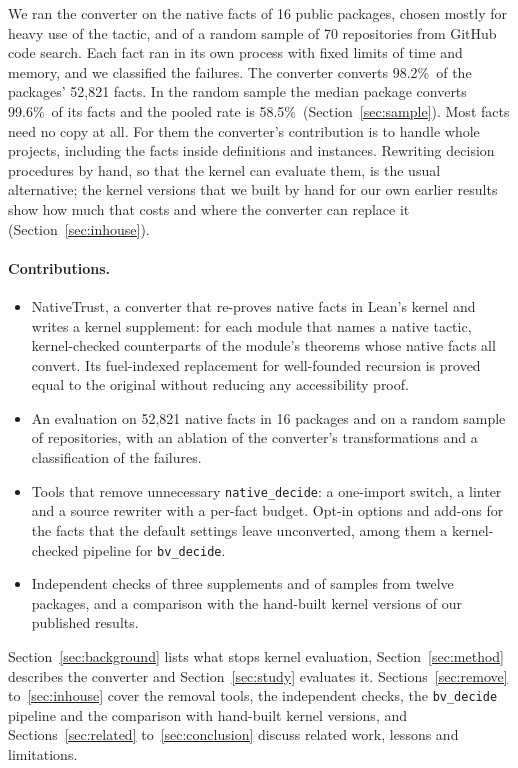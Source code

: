 \documentclass[11pt]{article}
\newcommand{\vtotrate}{98.2\%}   %
\newcommand{\vsamprate}{58.5\%}   %
\newcommand{\vsampmedian}{99.6\%}   %
\begin{document}
We ran the converter on the native facts of 16 public packages, chosen mostly for heavy use of the tactic, and
of a random sample of 70 repositories from GitHub code search. Each fact ran in its own process with fixed
limits of time and memory, and we classified the failures. The converter converts \vtotrate\ of the packages' 52,821
facts. In the random sample the median package converts \vsampmedian\ of its facts and the pooled rate is
\vsamprate\ (Section~\ref{sec:sample}). Most facts need no copy at all. For them the converter's
contribution is to handle whole projects, including the facts inside definitions and instances. Rewriting decision procedures by hand, so that the kernel can evaluate them, is the usual
alternative; the kernel versions that we built by hand for our own earlier results show how much that costs
and where the converter can replace it (Section~\ref{sec:inhouse}).

\paragraph{Contributions.}
\begin{itemize}
\item NativeTrust, a converter that re-proves native facts in Lean's kernel and writes a kernel supplement: for each module that names a native tactic, kernel-checked counterparts
  of the module's theorems whose native facts all convert. Its fuel-indexed replacement for well-founded
  recursion is proved equal to the original without reducing any accessibility proof.
\item An evaluation on 52,821 native facts in 16 packages and on a random sample of repositories, with an
  ablation of the converter's transformations and a classification of the failures.
\item Tools that remove unnecessary \texttt{native\_decide}: a one-import switch, a linter and a source
  rewriter with a per-fact budget. Opt-in options and add-ons for the facts that the default settings leave
  unconverted, among them a kernel-checked pipeline for \texttt{bv\_decide}.
\item Independent checks of three supplements and of samples from twelve packages, and a comparison with the
  hand-built kernel versions of our published results.
\end{itemize}
Section~\ref{sec:background} lists what stops kernel evaluation, Section~\ref{sec:method} describes the
converter and Section~\ref{sec:study} evaluates it. Sections~\ref{sec:remove} to~\ref{sec:inhouse} cover the
removal tools, the independent checks, the \texttt{bv\_decide} pipeline and the comparison with hand-built
kernel versions, and Sections~\ref{sec:related} to~\ref{sec:conclusion} discuss related work, lessons and
limitations.
\end{document}
